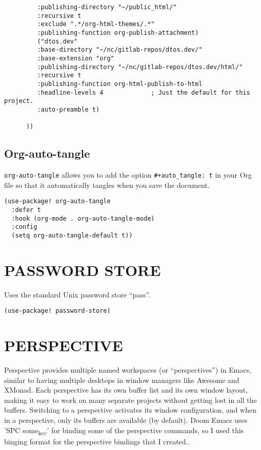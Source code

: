 \documentclass[11pt]{article}
\begin{document}
\begin{verbatim}
         :publishing-directory "~/public_html/"
         :recursive t
         :exclude ".*/org-html-themes/.*"
         :publishing-function org-publish-attachment)
         ("dtos.dev"
         :base-directory "~/nc/gitlab-repos/dtos.dev/"
         :base-extension "org"
         :publishing-directory "~/nc/gitlab-repos/dtos.dev/html/"
         :recursive t
         :publishing-function org-html-publish-to-html
         :headline-levels 4             ; Just the default for this project.
         :auto-preamble t)

      ))
\end{verbatim}

\subsection{Org-auto-tangle}
\label{sec:org107eaff}
\texttt{org-auto-tangle} allows you to add the option \texttt{\#+auto\_tangle: t} in your Org file so that it automatically tangles when you save the document.

\begin{verbatim}
(use-package! org-auto-tangle
  :defer t
  :hook (org-mode . org-auto-tangle-mode)
  :config
  (setq org-auto-tangle-default t))

\end{verbatim}

\section{PASSWORD STORE}
\label{sec:org0e91d24}
Uses the standard Unix password store ``pass''.

\begin{verbatim}
(use-package! password-store)
\end{verbatim}

\section{PERSPECTIVE}
\label{sec:orgc2ccd40}
Perspective provides multiple named workspaces (or ``perspectives'') in Emacs, similar to having multiple desktops in window managers like Awesome and XMonad.  Each perspective has its own buffer list and its own window layout, making it easy to work on many separate projects without getting lost in all the buffers.  Switching to a perspective activates its window configuration, and when in a perspective, only its buffers are available (by default).  Doom Emacs uses 'SPC some\textsubscript{key}' for binding some of the perspective commands, so I used this binging format for the perspective bindings that I created..
\end{document}
